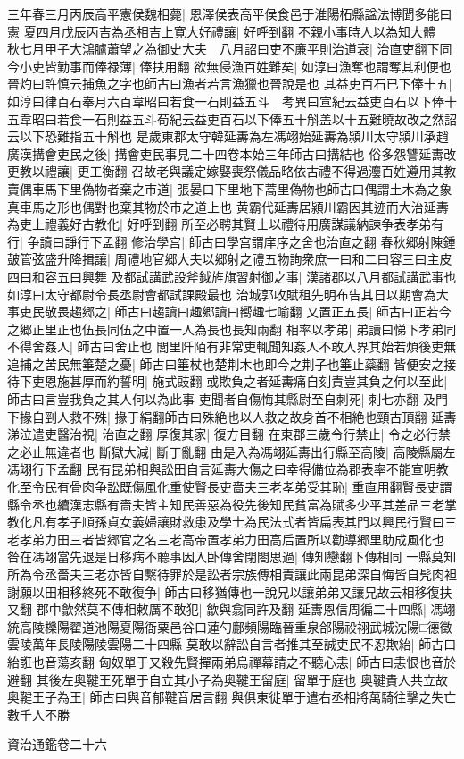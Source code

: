三年春三月丙辰高平憲侯魏相薨|{
	恩澤侯表高平侯食邑于淮陽柘縣諡法博聞多能曰憲}
夏四月戊辰丙吉為丞相吉上寛大好禮讓|{
	好呼到翻}
不親小事時人以為知大體　秋七月甲子大鴻臚蕭望之為御史大夫　八月詔曰吏不亷平則治道衰|{
	治直吏翻下同}
今小吏皆勤事而俸禄薄|{
	俸扶用翻}
欲無侵漁百姓難矣|{
	如淳曰漁奪也謂奪其利便也晉灼曰許慎云捕魚之字也師古曰漁者若言漁獵也晉說是也}
其益吏百石已下俸十五|{
	如淳曰律百石奉月六百韋昭曰若食一石則益五斗　考異曰宣紀云益吏百石以下俸十五韋昭曰若食一石則益五斗荀紀云益吏百石以下俸五十斛盖以十五難曉故改之然詔云以下恐難指五十斛也}
是歲東郡太守韓延夀為左馮翊始延夀為潁川太守潁川承趙廣漢搆會吏民之後|{
	搆會吏民事見二十四卷本始三年師古曰搆結也}
俗多怨讐延夀改更教以禮讓|{
	更工衡翻}
召故老與議定嫁娶喪祭儀品略依古禮不得過灋百姓遵用其教賣偶車馬下里偽物者棄之市道|{
	張晏曰下里地下蒿里偽物也師古曰偶謂土木為之象真車馬之形也偶對也棄其物於市之道上也}
黄霸代延夀居潁川霸因其迹而大治延夀為吏上禮義好古教化|{
	好呼到翻}
所至必聘其賢士以禮待用廣謀議納諫争表孝弟有行|{
	争讀曰諍行下孟翻}
修治學宫|{
	師古曰學宫謂庠序之舍也治直之翻}
春秋郷射陳鍾皷管弦盛升降揖讓|{
	周禮地官郷大夫以郷射之禮五物詢衆庶一曰和二曰容三曰主皮四曰和容五曰興舞}
及都試講武設斧鉞旌旗習射御之事|{
	漢諸郡以八月都試講武事也如淳曰太守都尉令長丞尉會都試課殿最也}
治城郭收賦租先明布告其日以期會為大事吏民敬畏趨郷之|{
	師古曰趨讀曰趣郷讀曰嚮趣七喻翻}
又置正五長|{
	師古曰正若今之郷正里正也伍長同伍之中置一人為長也長知兩翻}
相率以孝弟|{
	弟讀曰悌下孝弟同}
不得舍姦人|{
	師古曰舍止也}
閭里阡陌有非常吏輒聞知姦人不敢入界其始若煩後吏無追捕之苦民無箠楚之憂|{
	師古曰箠杖也楚荆木也即今之荆子也箠止蘂翻}
皆便安之接待下吏恩施甚厚而約誓明|{
	施式豉翻}
或欺負之者延夀痛自刻責豈其負之何以至此|{
	師古曰言豈我負之其人何以為此事}
吏聞者自傷悔其縣尉至自刺死|{
	刺七亦翻}
及門下掾自剄人救不殊|{
	掾于絹翻師古曰殊絶也以人救之故身首不相絶也頸古頂翻}
延夀涕泣遣吏醫治視|{
	治直之翻}
厚復其家|{
	復方目翻}
在東郡三歲令行禁止|{
	令之必行禁之必止無違者也}
斷獄大減|{
	斷丁亂翻}
由是入為馮翊延夀出行縣至高陵|{
	高陵縣屬左馮翊行下孟翻}
民有昆弟相與訟田自言延夀大傷之曰幸得備位為郡表率不能宣明教化至令民有骨肉争訟既傷風化重使賢長吏嗇夫三老孝弟受其恥|{
	重直用翻賢長吏謂縣令丞也續漢志縣有嗇夫皆主知民善惡為役先後知民貧富為賦多少平其差品三老掌教化凡有孝子順孫貞女義婦讓財救患及學士為民法式者皆扁表其門以興民行賢曰三老孝弟力田三者皆郷官之名三老高帝置孝弟力田高后置所以勸導郷里助成風化也}
咎在馮翊當先退是日移病不聼事因入卧傳舍閉閤思過|{
	傳知戀翻下傳相同}
一縣莫知所為令丞嗇夫三老亦皆自繫待罪於是訟者宗族傳相責讓此兩昆弟深自悔皆自髠肉袒謝願以田相移終死不敢復争|{
	師古曰移猶傳也一說兄以讓弟弟又讓兄故云相移復扶又翻}
郡中歙然莫不傳相敕厲不敢犯|{
	歙與翕同許及翻}
延夀恩信周徧二十四縣|{
	馮翊統高陵櫟陽翟道池陽夏陽衙粟邑谷口蓮勺鄜頻陽臨晉重泉郃陽祋祤武城沈陽□德徵雲陵萬年長陵陽陵雲陽二十四縣}
莫敢以辭訟自言者推其至誠吏民不忍欺紿|{
	師古曰紿誑也音蕩亥翻}
匈奴單于又殺先賢撣兩弟烏禪幕請之不聽心恚|{
	師古曰恚恨也音於避翻}
其後左奥鞬王死單于自立其小子為奥鞬王留庭|{
	留單于庭也}
奥鞬貴人共立故奥鞬王子為王|{
	師古曰與音郁鞬音居言翻}
與俱東徙單于遣右丞相將萬騎往擊之失亡數千人不勝

資治通鑑卷二十六
